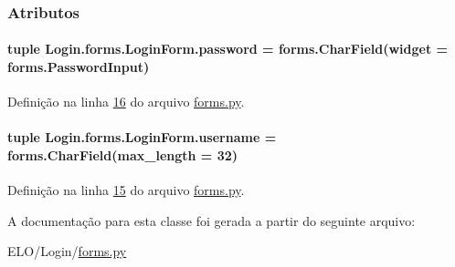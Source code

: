 \subsubsection{Atributos}
\hypertarget{classLogin_1_1forms_1_1LoginForm_a23e321f790e9c7bfc3e9abf767826a2d}{
\paragraph[{password}]{\setlength{\rightskip}{0pt plus 5cm}tuple Login.\-forms.\-Login\-Form.\-password = forms.\-Char\-Field(widget = forms.\-Password\-Input)\hspace{0.3cm}{\ttfamily [static]}}}\label{classLogin_1_1forms_1_1LoginForm_a23e321f790e9c7bfc3e9abf767826a2d}


Definição na linha \hyperlink{Login_2forms_8py_source_l00016}{16} do arquivo \hyperlink{Login_2forms_8py_source}{forms.\-py}.

\hypertarget{classLogin_1_1forms_1_1LoginForm_af3766bb4ea8cabdf57ad77214b7545fd}{
\paragraph[{username}]{\setlength{\rightskip}{0pt plus 5cm}tuple Login.\-forms.\-Login\-Form.\-username = forms.\-Char\-Field(max\-\_\-length = 32)\hspace{0.3cm}{\ttfamily [static]}}}\label{classLogin_1_1forms_1_1LoginForm_af3766bb4ea8cabdf57ad77214b7545fd}


Definição na linha \hyperlink{Login_2forms_8py_source_l00015}{15} do arquivo \hyperlink{Login_2forms_8py_source}{forms.\-py}.



A documentação para esta classe foi gerada a partir do seguinte arquivo\-:\begin{DoxyCompactItemize}
\item 
E\-L\-O/\-Login/\hyperlink{Login_2forms_8py}{forms.\-py}\end{DoxyCompactItemize}
